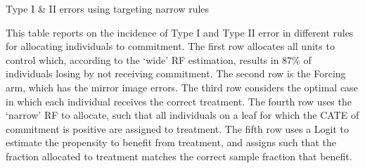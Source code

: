 

\vspace{.3in}
\begin{table}[H]
\caption{Type I \& II errors using targeting narrow rules}
\label{hit_miss_rule}
\begin{center}
\resizebox{0.95\textwidth}{!}{
\small{}
}
\end{center}
\scriptsize This table reports on the incidence of Type I and Type II error in different rules for allocating individuals to commitment.  The first row allocates all units to control which, according to the `wide' RF estimation, results in 87\% of individuals losing by not receiving commitment.  The second row is the Forcing arm, which has the mirror image errors.  The third row considers the optimal case in which each individual receives the correct treatment.  The fourth row uses the `narrow' RF to allocate, such that all individuals on a leaf for which the CATE of commitment is positive are assigned to treatment.  The fifth row uses a Logit to estimate the propensity to benefit from treatment, and assigns such that the fraction allocated to treatment matches the correct sample fraction that benefit.  
\end{table} 

